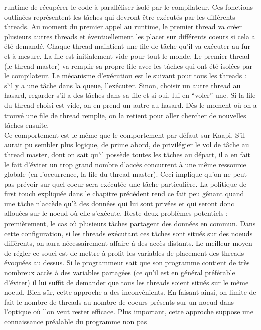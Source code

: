 \documentclass{report}
\begin{document}
runtime de récupérer le code à paralléliser isolé par le compilateur. Ces fonctions outlinées 
représentent les tâches qui devront être exécutés par les différents threads. Au moment du premier
appel au runtime, le premier thread va créer plusieurs autres threads et éventuellement les placer
sur différents coeurs si cela a été demandé. Chaque thread maintient une file de tâche qu'il va
exécuter au fur et à mesure. La file est initialement vide pour tout le monde. Le premier thread
(le thread master) va remplir sa propre file avec les tâches qui ont été isolées par le compilateur.
Le mécanisme d'exécution est le suivant pour tous les threads : s'il y a une tâche dans la queue,
l'exécuter. Sinon, choisir un autre thread au hasard, regarder s'il a des tâches dans sa file et si
oui, lui en ``voler'' une. Si la file du thread choisi est vide, on en prend un autre au hasard. 
Dès le moment où on a trouvé une file de thread remplie, on la retient pour aller chercher de 
nouvelles tâches ensuite. 
\\Ce comportement est le même que le comportement par défaut sur Kaapi. S'il aurait pu sembler
plus logique, de prime abord, de privilégier le vol de tâche au thread master, dont on sait
qu'il possède toutes les tâches au départ, il a en fait le fait d'éviter un trop grand 
nombre d'accès concurrent à une même ressource globale (en l'occurrence, la file du thread
master). Ceci implique qu'on ne peut pas prévoir sur quel coeur sera exécutée une tâche 
particulière. La politique de first touch expliquée dans le chapitre précédent rend ce 
fait peu gênant quand une tâche n'accède qu'à des données qui lui sont privées et qui seront
donc allouées sur le noeud où elle s'exécute. Reste deux problèmes potentiels : premièrement,
le cas où plusieurs tâches partagent des données en commun. Dans cette configuration, si les
threads exécutant ces tâches sont situés sur des noeuds différents, on aura nécessairement
affaire à des accès distants. Le meilleur moyen de régler ce souci est de mettre à profit
les variables de placement des threads évoquées au dessus. Si le programmeur sait que son
programme contient de très nombreux accès à des variables partagées (ce qu'il est en général
préférable d'éviter) il lui suffit de demander que tous les threads soient situés sur le même
noeud. Bien sûr, cette approche a des inconvénients. En faisant ainsi, on limite de fait le
nombre de threads au nombre de coeurs présents sur un noeud dans l'optique où l'on veut rester
efficace. Plus important, cette approche suppose une connaissance préalable du programme non pas
\end{document}
